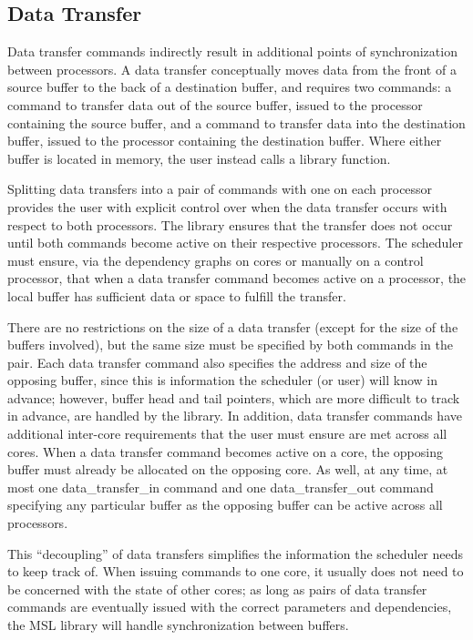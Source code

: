 \subsection{Data Transfer}

Data transfer commands indirectly result in additional points of
synchronization between processors. A data transfer conceptually moves
data from the front of a source buffer to the back of a destination
buffer, and requires two commands: a command to transfer data out of
the source buffer, issued to the processor containing the source
buffer, and a command to transfer data into the destination buffer,
issued to the processor containing the destination buffer. Where
either buffer is located in memory, the user instead calls a library
function.

Splitting data transfers into a pair of commands with one on each
processor provides the user with explicit control over when the data
transfer occurs with respect to both processors. The library ensures
that the transfer does not occur until both commands become active on
their respective processors. The scheduler must ensure, via the
dependency graphs on cores or manually on a control processor, that
when a data transfer command becomes active on a processor, the local
buffer has sufficient data or space to fulfill the transfer.


There are no restrictions on the size of a data transfer (except for
the size of the buffers involved), but the same size must be specified
by both commands in the pair. Each data transfer command also
specifies the address and size of the opposing buffer, since this is
information the scheduler (or user) will know in advance; however,
buffer head and tail pointers, which are more difficult to track in
advance, are handled by the library. In addition, data transfer
commands have additional inter-core requirements that the user must
ensure are met across all cores. When a data transfer command becomes
active on a core, the opposing buffer must already be allocated on the
opposing core. As well, at any time, at most one \textsf{data_transfer_in}
command and one \textsf{data_transfer_out} command specifying any
particular buffer as the
opposing buffer can be active across all processors.

This ``decoupling'' of data transfers simplifies the information the
scheduler needs to keep track of. When issuing commands to one core,
it usually does not need to be concerned with the state of other
cores; as long as pairs of data transfer commands are eventually
issued with the correct parameters and dependencies, the MSL library
will handle synchronization between buffers.

